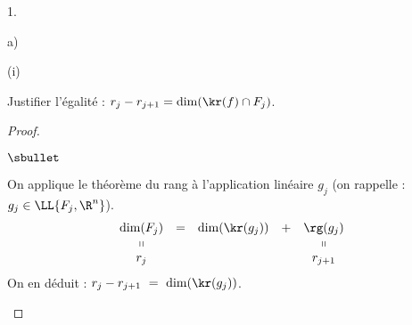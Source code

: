 \documentclass[11pt]{article}%
\begin{document}
\begin{noliste}{1.}
\begin{noliste}{a)}

    \begin{nonoliste}{(i)}
      \setcounter{enumiii}{1}
    \item Justifier l'égalité : $r_j-r_{j+1}=\dim(\kr(f) \cap F_j)$.
      
      \begin{proof}~
        \begin{noliste}{$\sbullet$}
        \item On applique le théorème du rang à l'application linéaire
          $g_j$ (on rappelle : $g_j \in \LL{F_j,\R^n}$).
	  \[
	    \begin{array}{ccccc}
	      \dim(F_j) &=& \dim(\kr(g_j)) & + & \rg(g_j)
	      \\
	      \shortparallel & & & & \shortparallel
	      \\
	      r_j & & & & r_{j+1}
	    \end{array}
	  \]
	  On en déduit : $r_j-r_{j+1} \ = \ \dim(\kr(g_j))$.
	  

\end{noliste}
\end{proof}
\end{nonoliste}
\end{noliste}
\end{noliste}
\end{document}
